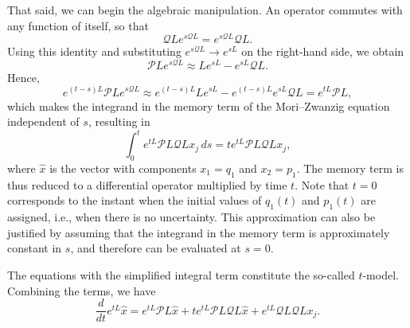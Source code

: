\documentclass[12pt]{article}
\begin{document}
That said, we can begin the algebraic manipulation. An operator commutes with any function of itself, so that
\begin{equation*}
	\mathcal{Q}L e^{s\mathcal{Q}L} = e^{s\mathcal{Q}L} \mathcal{Q}L.
\end{equation*}
Using this identity and substituting $e^{s\mathcal{Q}L} \to e^{sL}$ on the right-hand side, we obtain
\begin{equation*}
	\mathcal{P}L e^{s\mathcal{Q}L} \approx Le^{sL} - e^{sL}\mathcal{Q}L.
\end{equation*}
Hence,
\begin{equation*}
	e^{(t-s)L} \mathcal{P}L e^{s\mathcal{Q}L} \approx e^{(t-s)L}Le^{sL} - e^{(t-s)L} e^{sL}\mathcal{Q}L = e^{tL}\mathcal{P}L,
\end{equation*}
which makes the integrand in the memory term of the Mori–Zwanzig equation independent of $s$, resulting in
\begin{equation*}
	\int_0^t e^{tL}\mathcal{P}L\mathcal{Q}L x_j \, ds = t e^{tL}\mathcal{P}L\mathcal{Q}L x_j,
\end{equation*}
where $\hat{x}$ is the vector with components $x_1 = q_1$ and $x_2 = p_1$. The memory term is thus reduced to a differential operator multiplied by time $t$. Note that $t=0$ corresponds to the instant when the initial values of $q_1(t)$ and $p_1(t)$ are assigned, i.e., when there is no uncertainty. This approximation can also be justified by assuming that the integrand in the memory term is approximately constant in $s$, and therefore can be evaluated at $s=0$.

The equations with the simplified integral term constitute the so-called $t$-model. Combining the terms, we have
\begin{equation*}
	\frac{d}{dt} e^{tL} \hat{x} = e^{tL}\mathcal{P}L \hat{x} + t e^{tL}\mathcal{P}L\mathcal{Q}L \hat{x} + e^{tL}\mathcal{Q}L\mathcal{Q}L x_j.
\end{equation*}
\end{document}
